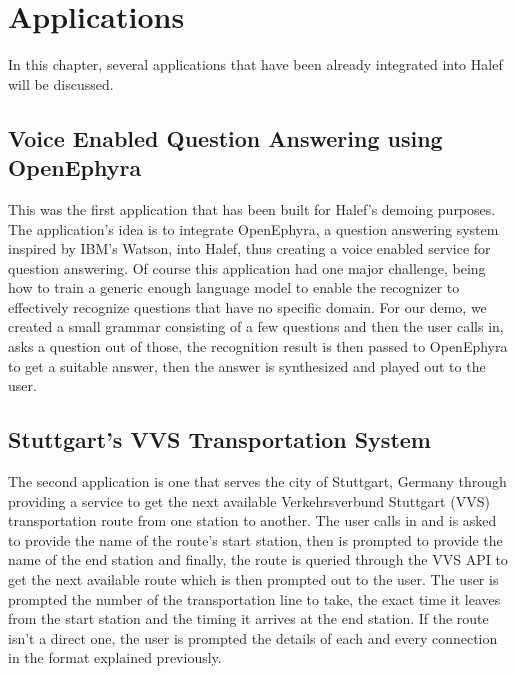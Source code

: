 \chapter{Applications}
\label{chap:applications}
In this chapter, several applications that have been already integrated into Halef will be discussed.

\section{Voice Enabled Question Answering using OpenEphyra}
This was the first application that has been built for Halef's demoing purposes.
The application's idea is to integrate OpenEphyra, a question answering system inspired by IBM's Watson, into Halef, thus creating a voice enabled service for question answering.
Of course this application had one major challenge, being how to train a generic enough language model to enable the recognizer to effectively recognize questions that have no specific domain.
For our demo, we created a small grammar consisting of a few questions and then the user calls in, asks a question out of those, the recognition result is then passed to OpenEphyra to get a suitable answer, then the answer is synthesized and played out to the user.

\section{Stuttgart's VVS Transportation System}
The second application is one that serves the city of Stuttgart, Germany through providing a service to get the next available Verkehrsverbund Stuttgart (VVS) transportation route from one station to another.
The user calls in and is asked to provide the name of the route's start station, then is prompted to provide the name of the end station and finally, the route is queried through the VVS API to get the next available route which is then prompted out to the user.
The user is prompted the number of the transportation line to take, the exact time it leaves from the start station and the timing it arrives at the end station.
If the route isn't a direct one, the user is prompted the details of each and every connection in the format explained previously.
